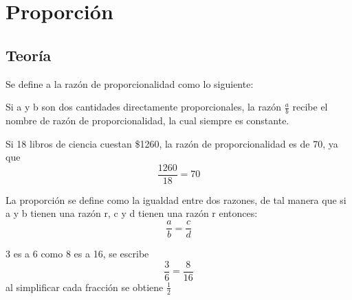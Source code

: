 \section{Proporción}
\subsection{Teoría}
Se define a la razón de proporcionalidad como lo siguiente:
\begin{definicion}
    Si a y b son dos cantidades directamente proporcionales, la razón $\frac{a}{b}$ recibe el nombre de razón de proporcionalidad, la cual siempre es constante.
\end{definicion}
\begin{ejemplo}
    Si 18 libros de ciencia cuestan \$1260, la razón de proporcionalidad es de 70, ya que
    \begin{equation*}
        \frac{1260}{18} = 70
    \end{equation*}
\end{ejemplo}
La proporción se define como la igualdad entre dos razones, de tal manera que si a y b tienen una razón r, c y d tienen una razón r entonces:
\begin{equation*}
    \frac{a}{b}=\frac{c}{d}
\end{equation*}
\begin{ejemplo}
    3 es a 6 como 8 es a 16, se escribe
    \begin{equation*}
        \frac{3}{6} = \frac{8}{16}
    \end{equation*}
    al simplificar cada fracción se obtiene $\frac{1}{2}$
\end{ejemplo}